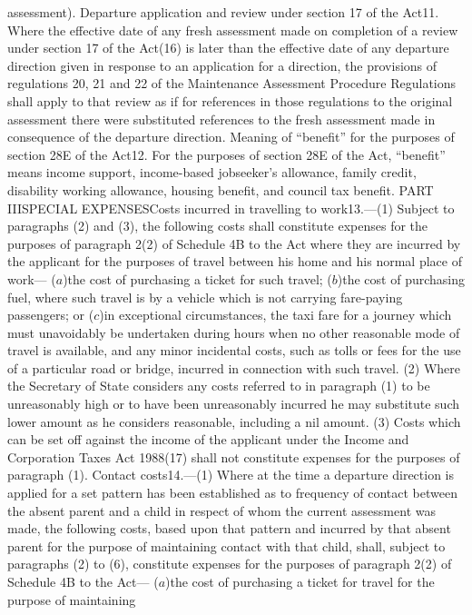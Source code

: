\documentclass[a4paper]{article}
\begin{document}
assessment).
Departure application and review under section 17 of the Act11. Where the
effective date of any fresh assessment made on completion of a review under
section 17 of the Act(16) is later than the effective date of any departure
direction given in response to an application for a direction, the provisions of
regulations 20, 21 and 22 of the Maintenance Assessment Procedure Regulations
shall apply to that review as if for references in those regulations to the
original assessment there were substituted references to the fresh assessment
made in consequence of the departure direction.
Meaning of “benefit” for the purposes of section 28E of the Act12. For the
purposes of section 28E of the Act, “benefit” means income support, income-based
jobseeker’s allowance, family credit, disability working allowance, housing
benefit, and council tax benefit.
PART IIISPECIAL EXPENSESCosts incurred in travelling to work13.—(1) Subject to
paragraphs (2) and (3), the following costs shall constitute expenses for the
purposes of paragraph 2(2) of Schedule 4B to the Act where they are incurred by
the applicant for the purposes of travel between his home and his normal place
of work—
($a$)the cost of purchasing a ticket for such travel;
($b$)the cost of purchasing fuel, where such travel is by a vehicle which is not
carrying fare-paying passengers; or
($c$)in exceptional circumstances, the taxi fare for a journey which must
unavoidably be undertaken during hours when no other reasonable mode of travel
is available,
and any minor incidental costs, such as tolls or fees for the use of a
particular road or bridge, incurred in connection with such travel.
(2) Where the Secretary of State considers any costs referred to in paragraph
(1) to be unreasonably high or to have been unreasonably incurred he may
substitute such lower amount as he considers reasonable, including a nil amount.
(3) Costs which can be set off against the income of the applicant under the
Income and Corporation Taxes Act 1988(17) shall not constitute expenses for the
purposes of paragraph (1).
Contact costs14.—(1) Where at the time a departure direction is applied for a
set pattern has been established as to frequency of contact between the absent
parent and a child in respect of whom the current assessment was made, the
following costs, based upon that pattern and incurred by that absent parent for
the purpose of maintaining contact with that child, shall, subject to paragraphs
(2) to (6), constitute expenses for the purposes of paragraph 2(2) of Schedule
4B to the Act—
($a$)the cost of purchasing a ticket for travel for the purpose of maintaining
\end{document}

